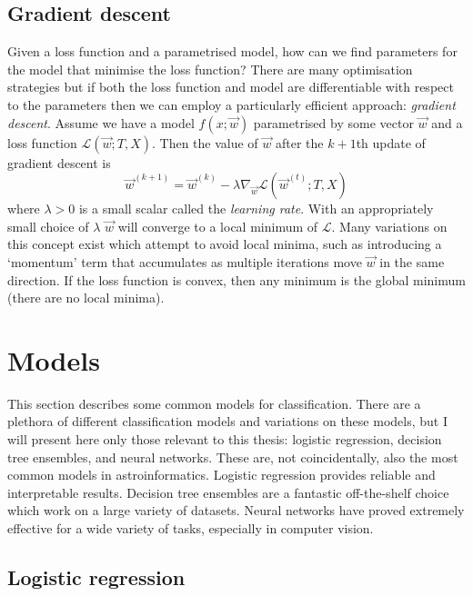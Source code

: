 \documentclass[11pt, a4paper]{book}
\newcommand{\defn}[1]{\emph{#1}}
\begin{document}
    \subsection{Gradient descent}
    \label{sec:gradient-descent}

        Given a loss function and a parametrised model, how can we find parameters for the model that minimise the loss function? There are many optimisation strategies but if both the loss function and model are differentiable with respect to the parameters then we can employ a particularly efficient approach: \defn{gradient descent}. Assume we have a model $f(x; \vec w)$ parametrised by some vector $\vec w$ and a loss function $\mathcal L(\vec w; T, X)$. Then the value of $\vec w$ after the $k + 1$th update of gradient descent is
        \begin{equation}
            \label{eq:gradient-descent}
            \vec w^{(k + 1)} = \vec w^{(k)} - \lambda \nabla_{\vec w} \mathcal L(\vec w^{(t)}; T, X)
        \end{equation}
        where $\lambda > 0$ is a small scalar called the \defn{learning rate}. With an appropriately small choice of $\lambda$ $\vec w$ will converge to a local minimum of $\mathcal L$. Many variations on this concept exist which attempt to avoid local minima, such as introducing a `momentum' term that accumulates as multiple iterations move $\vec w$ in the same direction. If the loss function is convex, then any minimum is the global minimum (there are no local minima).

\section{Models}
\label{sec:models}

    This section describes some common models for classification. There are a plethora of different classification models and variations on these models, but I will present here only those relevant to this thesis: logistic regression, decision tree ensembles, and neural networks. These are, not coincidentally, also the most common models in astroinformatics. Logistic regression provides reliable and interpretable results. Decision tree ensembles are a fantastic off-the-shelf choice which work on a large variety of datasets. Neural networks have proved extremely effective for a wide variety of tasks, especially in computer vision.

    \subsection{Logistic regression}
    \label{sec:logistic-regression}
\end{document}
